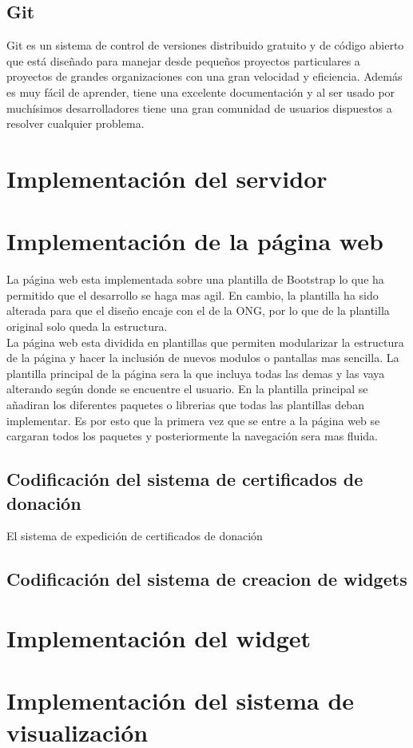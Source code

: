 \subsection{Git}
Git es un sistema de control de versiones distribuido gratuito y de código abierto que está diseñado para manejar desde pequeños proyectos particulares a proyectos de grandes organizaciones con una gran velocidad y eficiencia. Además es muy fácil de aprender, tiene una excelente documentación y al ser usado por muchísimos desarrolladores tiene una gran comunidad de usuarios dispuestos a resolver cualquier problema.

\section{Implementación del servidor}


\section{Implementación de la página web}
La página web esta implementada sobre una plantilla de Bootstrap lo que ha permitido que el desarrollo se haga mas agil. En cambio, la plantilla ha sido alterada para que el diseño encaje con el de la ONG, por lo que de la plantilla original solo queda la estructura. \\

La página web esta dividida en plantillas que permiten modularizar la estructura de la página y hacer la inclusión de nuevos modulos o pantallas mas sencilla. La plantilla principal de la página sera la que incluya todas las demas y las vaya alterando según donde se encuentre el usuario. En la plantilla principal se añadiran los diferentes paquetes o librerias que todas las plantillas deban implementar. Es por esto que la primera vez que se entre a la página web se cargaran todos los paquetes y posteriormente la navegación sera mas fluida.

\subsection{Codificación del sistema de certificados de donación}
El sistema de expedición de certificados de donación

\subsection{Codificación del sistema de creacion de widgets}


\section{Implementación del widget}

\section{Implementación del sistema de visualización}